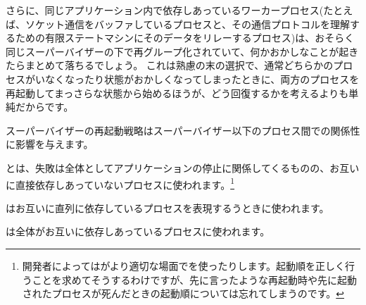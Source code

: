 さらに、同じアプリケーション内で依存しあっているワーカープロセス(たとえば、ソケット通信をバッファしているプロセスと、その通信プロトコルを理解するための有限ステートマシンにそのデータをリレーするプロセス)は、おそらく同じスーパーバイザーの下で再グループ化されていて、何かおかしなことが起きたらまとめて落ちるでしょう。
これは熟慮の末の選択で、通常どちらかのプロセスがいなくなったり状態がおかしくなってしまったときに、両方のプロセスを再起動してまっさらな状態から始めるほうが、どう回復するかを考えるよりも単純だからです。

スーパーバイザーの再起動戦略はスーパーバイザー以下のプロセス間での関係性に影響を与えます。

\begin{itemize*}
  \item {}とは、失敗は全体としてアプリケーションの停止に関係してくるものの、お互いに直接依存しあっていないプロセスに使われます。\footnote{開発者によってはがより適切な場面でを使ったりします。起動順を正しく行うことを求めてそうするわけですが、先に言ったような再起動時や先に起動されたプロセスが死んだときの起動順については忘れてしまうのです。}
  \item {}はお互いに直列に依存しているプロセスを表現するうときに使われます。
  \item {}は全体がお互いに依存しあっているプロセスに使われます。
\end{itemize*}

